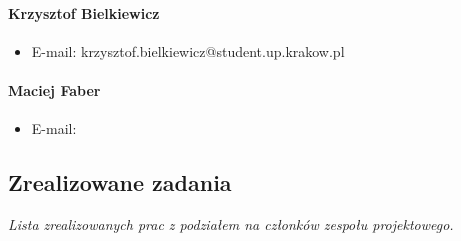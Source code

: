 \documentclass[12pt,a4paper,oneside]{article}
\theoremstyle{definition}
\numberwithin{equation}{section}
\begin{document}
    \paragraph{Krzysztof Bielkiewicz}
    \begin{itemize}
        \item E-mail:  krzysztof.bielkiewicz@student.up.krakow.pl
    \end{itemize}
    \paragraph{Maciej Faber}
    \begin{itemize}
        \item E-mail:
    \end{itemize}

\subsection{Zrealizowane zadania}
\textit{Lista zrealizowanych prac z podziałem na członków zespołu projektowego.}
\end{document}
